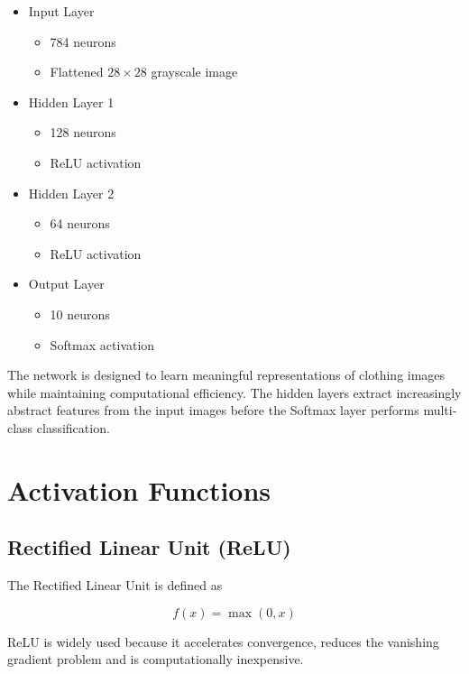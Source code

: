 \documentclass[12pt,a4paper]{article}
\begin{document}
\begin{itemize}

\item Input Layer
\begin{itemize}
\item 784 neurons
\item Flattened $28 \times 28$ grayscale image
\end{itemize}

\item Hidden Layer 1
\begin{itemize}
\item 128 neurons
\item ReLU activation
\end{itemize}

\item Hidden Layer 2
\begin{itemize}
\item 64 neurons
\item ReLU activation
\end{itemize}

\item Output Layer
\begin{itemize}
\item 10 neurons
\item Softmax activation
\end{itemize}

\end{itemize}

The network is designed to learn meaningful representations of clothing images while maintaining computational efficiency. The hidden layers extract increasingly abstract features from the input images before the Softmax layer performs multi-class classification.

\section{Activation Functions}

\subsection{Rectified Linear Unit (ReLU)}

The Rectified Linear Unit is defined as

\[
f(x)=\max(0,x)
\]

ReLU is widely used because it accelerates convergence, reduces the vanishing gradient problem and is computationally inexpensive.
\end{document}
